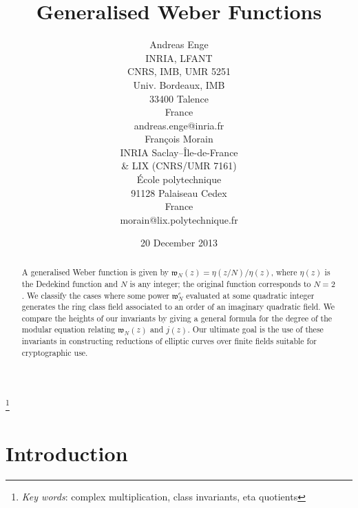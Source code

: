 \documentclass[12pt,twoside,leqno]{article}
\numberwithin{equation}{section}
\newcommand{\w}{\mathfrak w}
\begin{document}
\title{Generalised Weber Functions}

\author
{
\parbox [t]{6.3cm}{
Andreas Enge \\
INRIA, LFANT \\
CNRS, IMB, UMR 5251 \\
Univ. Bordeaux, IMB \\
33400 Talence \\
France \\
andreas.enge@inria.fr
}
\parbox [t]{6.3cm}{
Fran\c{c}ois Morain \\
INRIA Saclay--\^Ile-de-France \\
\& LIX (CNRS/UMR 7161) \\
\'Ecole polytechnique \\
91128 Palaiseau Cedex \\
France \\
morain@lix.polytechnique.fr
}
}
\date{20 December 2013}

\maketitle

\begin{abstract}
A generalised Weber function is given by $\w_N(z) = \eta(z/N)/\eta(z)$,
where $\eta(z)$ is the Dedekind function and $N$ is any integer; the
original function corresponds to $N=2$. We classify
the cases where some power $\w_N^e$ evaluated at
some quadratic integer
generates the ring class field associated to an order of an imaginary
quadratic field. We
compare the heights of our invariants by giving a general formula for
the degree of the modular equation relating $\w_N(z)$ and
$j(z)$. Our ultimate goal is the use of these invariants in
constructing reductions of elliptic curves over finite fields suitable
for cryptographic use.
\end{abstract}

\renewcommand{\thefootnote}{}
\footnote {\textit {Key words}:
complex multiplication,
class invariants,
eta quotients}




\section{Introduction}
\end{document}
